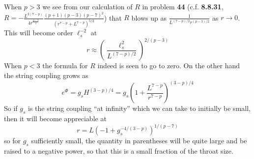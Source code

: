 \documentclass[11pt, class=article, crop=false]{standalone}
\begin{document}
\begin{enumerate}
	When $p > 3$ we see from our  calculation of $R$ in problem \textbf{44} (c.f. \textbf{8.8.31}, $R = -\frac{L^{2(7-p)}}{4 r^{\frac{p-3}{2}}}\frac{(p+1)(p-3)(p-7)^2}{(r^{7-p}+L^{7-p})^{5/2}}$) that $R$ blows up as $\frac{1}{L^{(7-p)/2} r^{(p-3)/2}}$ as $r \to 0$. This will become order $\ell_s^{-2}$ at 
	\[
		r \approx \left(\frac{\ell_s^2}{L^{(7-p)/2}}\right)^{2/(p-3)}
	\]	
	When $p < 3$ the formula for $R$ indeed is seen to go to zero. On the other hand the string coupling grows as
	\[
		e^{\Phi} = g_s H^{(3-p)/4} = g_s \left(1 + \frac{L^{7-p}}{r^{7-p}} \right)^{(3-p)/4}
	\]
	So if $g_s$ is the string coupling ``at infinity'' which we can take to initially be small, then it will become appreciable at
	\[
		r = L (-1 + g_s^{-4/(3-p)})^{1/(p-7)}
	\]
	so for $g_s$ sufficiently small, the quantity in parentheses will be quite large and be raised to a negative power, so that this is a small fraction of the throat size. 
	

\end{enumerate}
\end{document}
